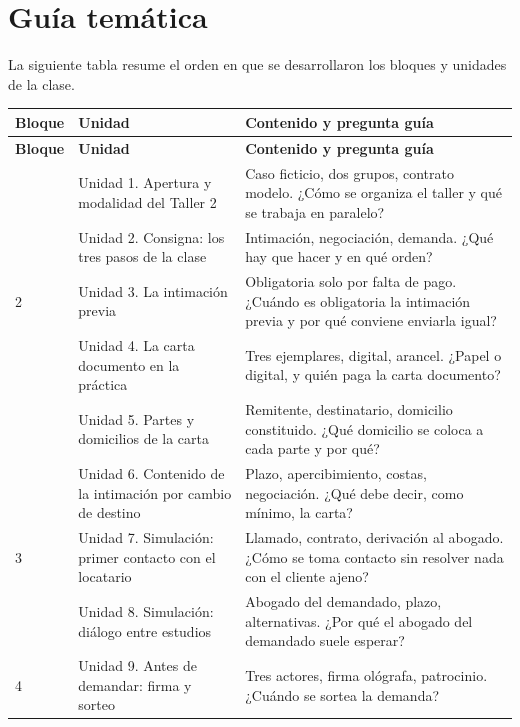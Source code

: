 \documentclass[12pt,oneside]{book}
\begin{document}
\section*{Guía temática}

La siguiente tabla resume el orden en que se desarrollaron los bloques y unidades de la clase.

\begin{longtable}{>{\raggedright\arraybackslash}p{} >{\raggedright\arraybackslash}p{} >{\RaggedRight\arraybackslash}p{}}
\toprule
\textbf{Bloque} & \textbf{Unidad} & \textbf{Contenido y pregunta guía} \\
\midrule
\endfirsthead
\toprule
\textbf{Bloque} & \textbf{Unidad} & \textbf{Contenido y pregunta guía} \\
\midrule
\endhead
1 & Unidad 1. Apertura y modalidad del Taller 2 & Caso ficticio, dos grupos, contrato modelo. ¿Cómo se organiza el taller y qué se trabaja en paralelo? \\
\addlinespace
1 & Unidad 2. Consigna: los tres pasos de la clase & Intimación, negociación, demanda. ¿Qué hay que hacer y en qué orden? \\
\addlinespace
\cmidrule{1-3}
2 & Unidad 3. La intimación previa & Obligatoria solo por falta de pago. ¿Cuándo es obligatoria la intimación previa y por qué conviene enviarla igual? \\
\addlinespace
2 & Unidad 4. La carta documento en la práctica & Tres ejemplares, digital, arancel. ¿Papel o digital, y quién paga la carta documento? \\
\addlinespace
2 & Unidad 5. Partes y domicilios de la carta & Remitente, destinatario, domicilio constituido. ¿Qué domicilio se coloca a cada parte y por qué? \\
\addlinespace
2 & Unidad 6. Contenido de la intimación por cambio de destino & Plazo, apercibimiento, costas, negociación. ¿Qué debe decir, como mínimo, la carta? \\
\addlinespace
\cmidrule{1-3}
3 & Unidad 7. Simulación: primer contacto con el locatario & Llamado, contrato, derivación al abogado. ¿Cómo se toma contacto sin resolver nada con el cliente ajeno? \\
\addlinespace
3 & Unidad 8. Simulación: diálogo entre estudios & Abogado del demandado, plazo, alternativas. ¿Por qué el abogado del demandado suele esperar? \\
\addlinespace
\cmidrule{1-3}
4 & Unidad 9. Antes de demandar: firma y sorteo & Tres actores, firma ológrafa, patrocinio. ¿Cuándo se sortea la demanda? \\

\end{longtable}
\end{document}
